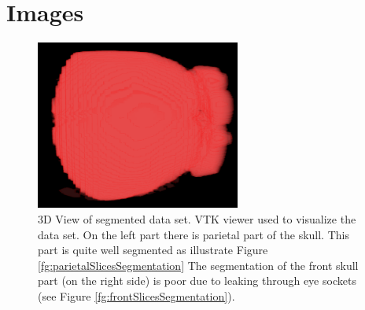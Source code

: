 \chapter{Images}

\begin{figure}[h]
    \centering
    \includegraphics[width=0.6\textwidth]{data/png/3d}
    \caption[3D view of segmented skull data set]
{
3D View of segmented data set.
VTK viewer used to visualize the data set.
On the left part there is parietal part of the skull.
This part is quite well segmented as illustrate Figure \ref{fg:parietalSlicesSegmentation}
The segmentation of the front skull part (on the right side) is poor due to leaking through eye sockets (see Figure \ref{fg:frontSlicesSegmentation}).
}
    \label{fg:series3d}
\end{figure}

